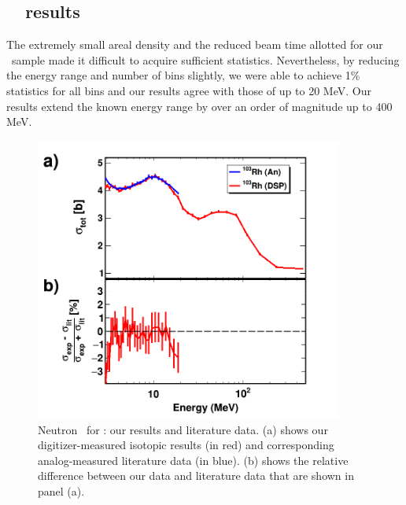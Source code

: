 \subsection{\rhThree\ \tot\ results}
The extremely small areal density and the reduced beam
time allotted for our \rhThree\ sample made it difficult to acquire sufficient statistics.
Nevertheless, by reducing the energy range and number of bins slightly, we were
able to achieve 1\% statistics for all bins and our results agree with those of
\cite{Poenitz1983} up to 20 MeV. Our results extend the known energy range by over an order of
magnitude up to 400 MeV.
\begin{figure}[ht!]
    \centering
    \includegraphics[width=0.9\textwidth]{figures/TwoPanelRh.png}
    \caption[Neutron \tot\ for \rhThree: our results and literature data]
    {
        Neutron \tot\ for \rhThree: our results and literature data.
        (a) shows our digitizer-measured isotopic results (in red) and
        corresponding analog-measured literature data \cite{Poenitz1983} (in blue).
        (b) shows the relative difference
        between our data and literature data that are shown in panel (a).
    }
    \label{TwoPanelRh}
\end{figure}

